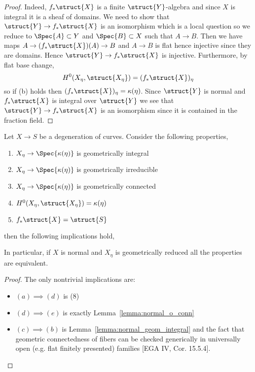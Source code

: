 \documentclass[12pt]{article}
\begin{document}
\begin{proof}
Indeed, $f_* \struct{X}$ is a finite $\struct{Y}$-algebra and since $X$ is integral it is a sheaf of domains. We need to show that $\struct{Y} \to f_* \struct{X}$ is an isomorphism which is a local question so we reduce to $\Spec{A} \subset Y$ and $\Spec{B} \subset X$ such that $A \to B$. Then we have maps $A \to (f_* \struct{X})(A) \to B$ and $A \to B$ is flat hence injective since they are domains. Hence $\struct{Y} \to f_* \struct{X}$ is injective. Furthermore, by flat base change,
\[ H^0(X_\eta, \struct{X_\eta}) = (f_* \struct{X})_{\eta} \]
so if (b) holds then $(f_* \struct{X})_{\eta} = \kappa(\eta)$. Since $\struct{Y}$ is normal and $f_* \struct{X}$ is integral over $\struct{Y}$ we see that $\struct{Y} \to f_* \struct{X}$ is an isomorphism since it is contained in the fraction field.
\end{proof}

\begin{prop}
Let $X \to S$ be a degeneration of curves. Consider the following properties,
\begin{enumerate}
\item $X_\eta \to \Spec{\kappa(\eta)}$ is geometrically integral

\item $X_\eta \to \Spec{\kappa(\eta)}$ is geometrically irreducible

\item $X_\eta \to \Spec{\kappa(\eta)}$ is geometrically connected

\item $H^0(X_\eta, \struct{X_\eta}) = \kappa(\eta)$

\item $f_* \struct{X} = \struct{S}$
\end{enumerate}
then the following implications hold,
\begin{center}
\end{center}
In particular, if $X$ is normal and $X_\eta$ is geometrically reduced all the properties are equivalent.
\end{prop}

\begin{proof}
The only nontrivial implications are:
\begin{itemize}
\item $(a) \implies (d)$ is  (8)
\item $(d) \implies (e)$ is exactly Lemma~\ref{lemma:normal_o_conn}
\item $(c) \implies (b)$ is Lemma~\ref{lemma:normal_geom_integral} and the fact that geometric connectedness of fibers can be checked generically in universally open (e.g. flat finitely presented) families [EGA IV, Cor. 15.5.4].
\end{itemize} 
\end{proof}
\end{document}
